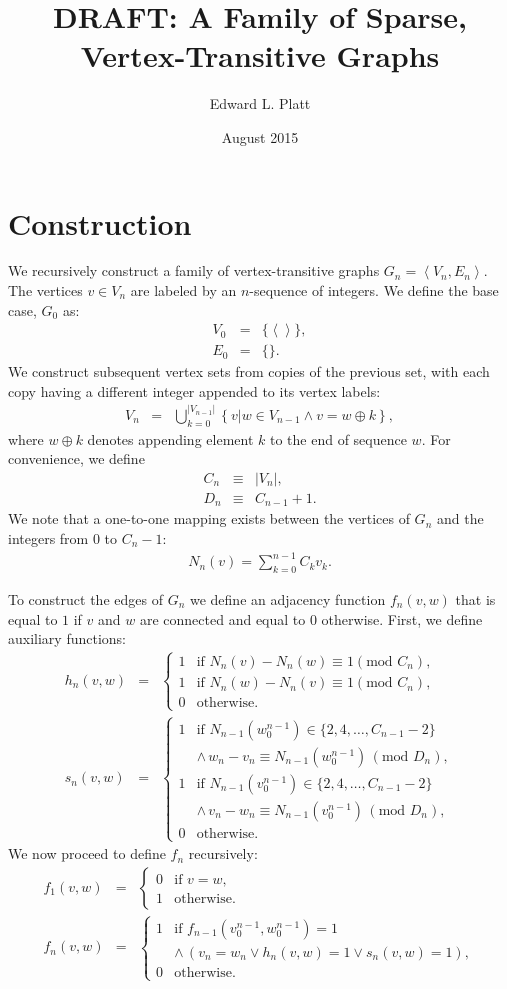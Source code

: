\documentclass{article}
\title{DRAFT: A Family of Sparse, Vertex-Transitive Graphs}
\author{Edward L. Platt}
\date{August 2015}
\newcommand{\la}{\left\langle}
\newcommand{\ra}{\right\rangle}
\newcommand{\beq}{\begin{eqnarray}}
\newcommand{\eeq}{\end{eqnarray}}
\newcommand{\append}{\oplus}
\begin{document}
\maketitle

\section{Construction}

We recursively construct a family of vertex-transitive graphs
$G_n = \la V_n, E_n \ra$.
The vertices $v \in V_n$ are labeled by an $n$-sequence of integers.
We define the base case, $G_0$ as:
\beq
V_0 &=& \{\la \ra\}, \\
E_0 &=& \{\}.
\eeq
We construct subsequent vertex sets from copies of the previous set,
with each copy having a different integer appended to its vertex labels:
\beq
V_n &=& \bigcup_{k = 0}^{|V_{n-1}|}
\left\{ v | w \in V_{n-1} \land v = w \append k \right\},
\eeq
where $w \append k$ denotes appending element $k$ to the end of sequence $w$.
For convenience, we define
\beq
C_n &\equiv& |V_n|, \\
D_n &\equiv& C_{n-1} + 1.
\eeq
We note that a one-to-one mapping exists between the vertices of $G_n$ and the
integers from $0$ to $C_n - 1$:
\beq
N_n(v) = \sum_{k=0}^{n-1} C_k v_k.
\eeq

To construct the edges of $G_n$ we define an adjacency function $f_n(v,w)$
that is equal to $1$ if $v$ and $w$ are connected and equal to $0$ otherwise.
First, we define auxiliary functions:
\beq
h_n(v,w)
&=&
\begin{cases}
1 & \mbox{if } N_n(v) - N_n(w) \equiv 1 (\mbox{mod } C_n), \\
1 & \mbox{if } N_n(w) - N_n(v) \equiv 1 (\mbox{mod } C_n), \\
0 & \mbox{otherwise}.
\end{cases} \\
s_n(v,w)
&=&
\begin{cases}
1 & \mbox{if }
N_{n-1}(w_0^{n-1}) \in \{ 2, 4, \ldots, C_{n-1} - 2\} \\
&
\land \, w_n - v_n \equiv N_{n-1}(w_0^{n-1}) \, (\mbox{mod } D_n), \\
1 & \mbox{if }
N_{n-1}(v_0^{n-1}) \in \{ 2, 4, \ldots, C_{n-1} - 2\} \\
&
\land \, v_n - w_n \equiv N_{n-1}(v_0^{n-1}) \, (\mbox{mod } D_n), \\
0 & \mbox{otherwise}.
\end{cases}
\eeq
We now proceed to define $f_n$ recursively:
\beq
f_1(v,w)
&=&
\begin{cases}
0 & \mbox{if } v = w, \\
1 & \mbox{otherwise}.
\end{cases} \\
f_n(v,w)
&=&
\begin{cases}
1 & \mbox{if } f_{n-1}(v_0^{n-1}, w_0^{n-1}) = 1 \\
&
\land \, (v_n = w_n
\lor
h_n(v, w) = 1
\lor
s_n(v, w) = 1
),\\
0 & \mbox{otherwise}.
\end{cases}
\eeq



\end{document}
